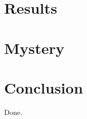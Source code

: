 \documentclass{article}
\begin{document}
\section{Results}\label{sec:r}

\section{Mystery}
\section{Conclusion}
Done.
\end{document}
